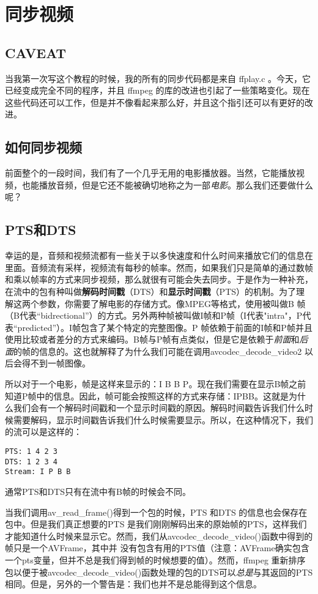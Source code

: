 ﻿\chapter{同步视频}
\label{ch5}
\section{CAVEAT}
当我第一次写这个教程的时候，我的所有的同步代码都是来自 ffplay.c 。今天，它已经变成完全不同的程序，并且 ffmpeg 的库的改进也引起了一些策略变化。现在这些代码还可以工作，但是并不像看起来那么好，并且这个指引还可以有更好的改进。
\section{如何同步视频}
前面整个的一段时间，我们有了一个几乎无用的电影播放器。当然，它能播放视频，也能播放音频，但是它还不能被确切地称之为一部\emph{电影}。那么我们还要做什么呢？
\section{PTS和DTS}
幸运的是，音频和视频流都有一些关于以多快速度和什么时间来播放它们的信息在里面。音频流有采样，视频流有每秒的帧率。然而，如果我们只是简单的通过数帧和乘以帧率的方式来同步视频，那么就很有可能会失去同步。于是作为一种补充，在流中的包有种叫做\textbf{解码时间戳}（DTS）和\textbf{显示时间戳}（PTS）的机制。为了理解这两个参数，你需要了解电影的存储方式。像MPEG等格式，使用被叫做B 帧（B代表“bidrectional”）的方式。另外两种帧被叫做I帧和P帧（I代表"intra"，P代表“predicted”）。I帧包含了某个特定的完整图像。P 帧依赖于前面的I帧和P帧并且使用比较或者差分的方式来编码。B帧与P帧有点类似，但是它是依赖于\emph{前面}和\emph{后面}的帧的信息的。这也就解释了为什么我们可能在调用avcodec_decode_video2 以后会得不到一帧图像。

所以对于一个电影，帧是这样来显示的：I B B P。现在我们需要在显示B帧之前知道P帧中的信息。因此，帧可能会按照这样的方式来存储：IPBB。这就是为什么我们会有一个解码时间戳和一个显示时间戳的原因。解码时间戳告诉我们什么时候需要解码，显示时间戳告诉我们什么时候需要显示。所以，在这种情况下，我们的流可以是这样的：

\begin{verbatim}
PTS: 1 4 2 3
DTS: 1 2 3 4
Stream: I P B B
\end{verbatim}

通常PTS和DTS只有在流中有B帧的时候会不同。

当我们调用av_read_frame()得到一个包的时候，PTS 和DTS 的信息也会保存在包中。但是我们真正想要的PTS 是我们刚刚解码出来的原始帧的PTS，这样我们才能知道什么时候来显示它。然而，我们从avcodec_decode_video()函数中得到的帧只是一个AVFrame，其中并 没有包含有用的PTS值（注意：AVFrame确实包含一个pts变量，但并不总是我们得到帧的时候想要的值）。然而，ffmpeg 重新排序包以便于被avcodec_decode_video()函数处理的包的DTS可以\emph{总是}与其返回的PTS相同。但是，另外的一个警告是：我们也并不是总能得到这个信息。

